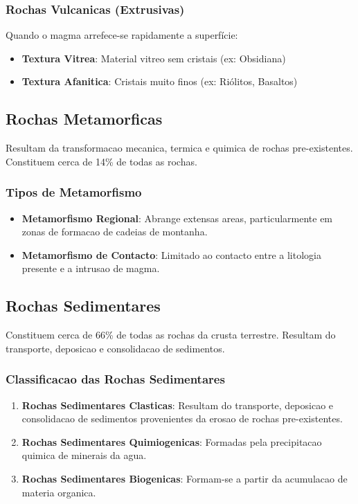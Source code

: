 \documentclass[12pt,a4paper,twoside]{book}
\begin{document}
\subsubsection{Rochas Vulcanicas (Extrusivas)}

Quando o magma arrefece-se rapidamente a superfície:
\begin{itemize}
    \item \textbf{Textura Vitrea}: Material vitreo sem cristais (ex: Obsidiana)
    \item \textbf{Textura Afanitica}: Cristais muito finos (ex: Riólitos, Basaltos)
\end{itemize}

\subsection{Rochas Metamorficas}

Resultam da transformacao mecanica, termica e quimica de rochas pre-existentes. Constituem cerca 
de 14\% de todas as rochas.

\subsubsection{Tipos de Metamorfismo}

\begin{itemize}
    \item \textbf{Metamorfismo Regional}: Abrange extensas areas, particularmente em zonas de 
    formacao de cadeias de montanha.
    
    \item \textbf{Metamorfismo de Contacto}: Limitado ao contacto entre a litologia presente 
    e a intrusao de magma.
\end{itemize}

\subsection{Rochas Sedimentares}

Constituem cerca de 66\% de todas as rochas da crusta terrestre. Resultam do transporte, deposicao 
e consolidacao de sedimentos.

\subsubsection{Classificacao das Rochas Sedimentares}

\begin{enumerate}
    \item \textbf{Rochas Sedimentares Clasticas}: Resultam do transporte, deposicao e consolidacao 
    de sedimentos provenientes da erosao de rochas pre-existentes.
    
    \item \textbf{Rochas Sedimentares Quimiogenicas}: Formadas pela precipitacao quimica de minerais 
    da agua.
    
    \item \textbf{Rochas Sedimentares Biogenicas}: Formam-se a partir da acumulacao de materia organica.
\end{enumerate}
\end{document}
